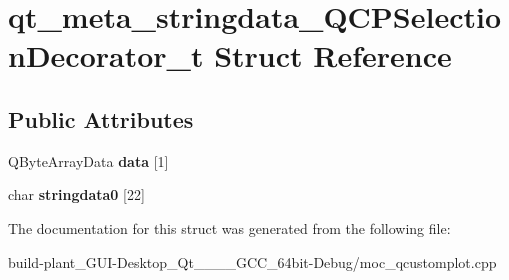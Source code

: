 \hypertarget{structqt__meta__stringdata__QCPSelectionDecorator__t}{}\section{qt\+\_\+meta\+\_\+stringdata\+\_\+\+Q\+C\+P\+Selection\+Decorator\+\_\+t Struct Reference}
\label{structqt__meta__stringdata__QCPSelectionDecorator__t}
\subsection*{Public Attributes}
\begin{DoxyCompactItemize}
\item 
\mbox{\label{structqt__meta__stringdata__QCPSelectionDecorator__t_a1afefbcc9caf562bf85a48bef4fdd12a}} 
Q\+Byte\+Array\+Data {\bfseries data} \mbox{[}1\mbox{]}
\item 
\mbox{\label{structqt__meta__stringdata__QCPSelectionDecorator__t_a396f24ff22a1439774cf0634b5080197}} 
char {\bfseries stringdata0} \mbox{[}22\mbox{]}
\end{DoxyCompactItemize}


The documentation for this struct was generated from the following file\+:\begin{DoxyCompactItemize}
\item 
build-\/plant\+\_\+\+G\+U\+I-\/\+Desktop\+\_\+\+Qt\+\_\+\_\+\_\+\_\+\+G\+C\+C\+\_\+64bit-\/\+Debug/moc\+\_\+qcustomplot.\+cpp\end{DoxyCompactItemize}

